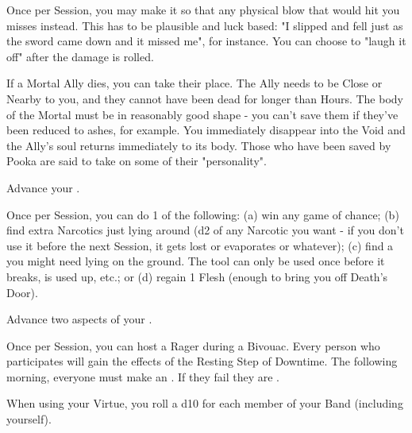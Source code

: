 \begin{multicols*}{2}

Once per Session, you may make it so that any physical blow that would hit you misses instead.  This has to be plausible and luck based: "I slipped and fell just as the sword came down and it missed me", for instance.  You can choose to "laugh it off" after the damage is rolled.


If a Mortal Ally dies, you can take their place.  The Ally needs to be Close or Nearby to you, and they cannot have been dead for longer than Hours.  The body of the Mortal must be in reasonably good shape - you can't save them if they've been reduced to ashes, for example.  You immediately disappear into the Void and the Ally's soul returns immediately to its body. Those who have been saved by Pooka are said to take on some of their "personality".


Advance your  \DCUP.


 Once per Session, you can do 1 of the following:  (a) win any game of chance; (b) find extra Narcotics just lying around (d2 \UD of any Narcotic you want - if you don't use it before the next Session, it gets lost or evaporates or whatever); (c) find a  you might need lying on the ground. The tool can only be used once before it breaks, is used up, etc.; or (d) regain 1 Flesh (enough to bring you off Death's Door).




Advance two  aspects of your  \DCUP.


Once per Session, you can host a Rager during a Bivouac.  Every person who participates will gain the effects of the Resting Step of Downtime. The following morning, everyone must make an \RSTRY{\VIG}. If they fail they are .

\newpage


When using your  Virtue, you roll a d10 for each member of your Band (including yourself).


\end{multicols*}
